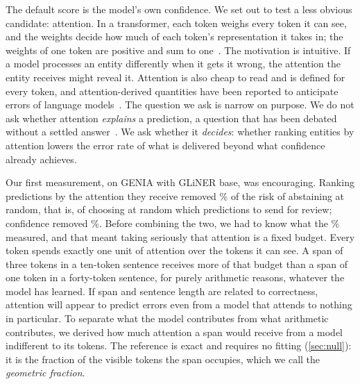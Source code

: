 \documentclass[11pt,a4paper]{article}
\newcommand{\gliner}{GLiNER}
\begin{document}
The default score is the model's own confidence. We set out to test a less obvious candidate:
attention. In a transformer, each token weighs every token it can see, and the weights decide how much of each
token's representation it takes in; the weights of one token are positive and sum to one~\citep{Vaswani2017}.
The motivation is intuitive. If a model processes an entity differently when it gets it
wrong, the attention the entity receives might reveal it. Attention is also cheap to read and is
defined for every token, and attention-derived quantities have been reported to anticipate errors of
language models~\citep{yuksekgonul2023attention,yan2026abstention}. The question we ask is narrow on
purpose. We do not ask whether attention \emph{explains} a prediction, a question that has been
debated without a settled answer~\citep{jain-wallace-2019-attention,wiegreffe-pinter-2019-attention}.
We ask whether it \emph{decides}: whether ranking entities by attention lowers the error rate of what
is delivered beyond what confidence already achieves.

Our first measurement, on GENIA with \gliner{} base, was encouraging. Ranking predictions by the attention they receive
removed \rrGeniaMassBase\% of the risk of abstaining at random, that is, of choosing at random which predictions to send
for review; confidence removed \rrGeniaConfBase\%. Before combining the two, we had to know what the \rrGeniaMassBase\%
measured, and that meant taking seriously that attention is a fixed budget. Every token spends exactly one unit of
attention over the tokens it can see. A span of three tokens in a ten-token sentence receives more of that budget than a
span of one token in a forty-token sentence, for purely arithmetic reasons, whatever the model has learned. If span and
sentence length are related to correctness, attention will appear to predict errors even from a model that attends to
nothing in particular. To separate what the model contributes from what arithmetic contributes, we derived how much
attention a span would receive from a model indifferent to its tokens. The reference is exact and requires no fitting
(\cref{sec:null}): it is the fraction of the visible tokens the span occupies, which we call the \emph{geometric fraction}.
\end{document}
